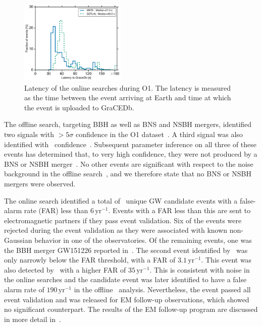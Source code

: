 \begin{figure}[t]
  \centering
  \includegraphics[width=0.45\textwidth]{figure2}
  \caption{\label{fig:latency} Latency of the online searches during O1.
           The latency is measured as the time between the event arriving at Earth
           and time at which the event is uploaded to \ac{GraCEDb}.}
\end{figure}

The offline search, targeting \ac{BBH} as well as \ac{BNS} and \ac{NSBH} mergers, identified
two signals with $> 5 \sigma$ confidence in the \ac{O1} dataset~\citep{Abbott:2016blz,Abbott:2016nmj}. A third signal was
also identified with \LVBLAHsignificance\ confidence~\citep{TheLIGOScientific:2016pea, TheLIGOScientific:2016qqj}. Subsequent
parameter inference on all three of these events has determined that, to very high
confidence, they were not produced by a \ac{BNS} or \ac{NSBH} merger~\citep{TheLIGOScientific:2016wfe, TheLIGOScientific:2016pea}. No other events
are significant with respect to the noise background in the offline search~\citep{TheLIGOScientific:2016pea}, and
we therefore state that no \ac{BNS} or \ac{NSBH} mergers were observed.

The online search identified a total of \OoneOnlineTotalEMFollowUpEvents\ unique \ac{GW} candidate events
with a false-alarm rate (FAR) less than
$6\, \mathrm{yr}^{-1}$.
Events with a FAR less than this are sent to electromagnetic partners if they
pass event validation.
Six of the events were rejected during the event validation as they were associated
with known non-Gaussian behavior in one of the observatories. Of the remaining
events, one was the \ac{BBH} merger GW151226 reported in~\citep{Abbott:2016nmj}. The second
event identified by \gstlal\ was only narrowly below the FAR threshold, with a FAR of $3.1\, \mathrm{yr}^{-1}$.
This event was also detected by \mbta\ with a higher FAR of $35\, \mathrm{yr}^{-1}$.
This is consistent with noise in the online searches and the candidate event was later
identified to have a false alarm rate of $190\, \mathrm{yr}^{-1}$
in the offline \gstlal\ analysis.
Nevertheless, the event passed all event validation and was released for \ac{EM} follow-up observations,
which showed no significant counterpart. The results
of the \ac{EM} follow-up program are discussed in more detail in~\citep{Abbott:2016gcq}.

